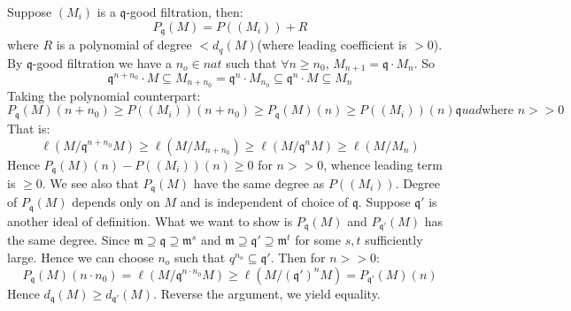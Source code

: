 \documentclass[12pt]{article}
\theoremstyle{definition}
\theoremstyle{plain}
\begin{document}
\Prop Suppose $(M_i)$ is a $\mathfrak{q}$-good filtration, then:
\[P_\mathfrak{q}(M)=P((M_i))+R\]
where $R$ is a polynomial of degree $<d_q(M)$(where leading coefficient is $>0$).
\proof By $\mathfrak{q}$-good filtration we have a $n_o\in nat$ such that $\forall n\geq n_0$, $M_{n+1}=\mathfrak{q}\cdot M_n$. So
\[\mathfrak{q}^{n+n_0}\cdot M\subseteq M_{n+n_0}=\mathfrak{q}^n\cdot M_{n_0}\subseteq \mathfrak{q}^n\cdot M\subseteq M_n\]
Taking the polynomial counterpart:
\[P_\mathfrak{q}(M)(n+n_0)\geq P((M_i))(n+n_0)\geq P_\mathfrak{q}(M)(n)\geq P((M_i))(n)\mathfrak{q}uad \text{where }n>>0\]
That is:
\[\ell(M/\mathfrak{q}^{n+n_0}M)\geq \ell(M/M_{n+n_0})\geq \ell(M/\mathfrak{q}^nM)\geq \ell(M/M_n)\]
Hence $P_\mathfrak{q}(M)(n)-P((M_i))(n)\geq 0$ for $n>>0$, whence leading term is $\geq 0$. We see also that $P_\mathfrak{q}(M)$ have the same degree as $P((M_i))$.
\Prop Degree of $P_\mathfrak{q}(M)$ depends only on $M$ and is independent of choice of $\mathfrak{q}$.
\proof Suppose $\mathfrak{q}'$ is another ideal of definition. What we want to show is $P_\mathfrak{q}(M)$ and $P_{\mathfrak{q}'}(M)$ has the same degree. Since
$\mathfrak{m}\supseteq \mathfrak{q}\supseteq \mathfrak{m}^s$ and $\mathfrak{m}\supseteq \mathfrak{q}'\supseteq \mathfrak{m}^t$ for some $s, t$ sufficiently large. Hence we can choose  $n_o$ such that $q^{n_o}\subseteq \mathfrak{q}'$. Then for $n>>0$:
\[P_\mathfrak{q}(M)(n\cdot n_0)=\ell(M/\mathfrak{q}^{n\cdot n_0}M)\geq \ell(M/(\mathfrak{q}')^nM)=P_\mathfrak{q'}(M)(n)\]
Hence $d_\mathfrak{q}(M)\geq d_{\mathfrak{q}'}(M)$. Reverse the argument, we yield equality.
\end{document}
